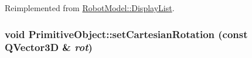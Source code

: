 Reimplemented from \hyperlink{class_robot_model_1_1_display_list_a56a652740c494995c0ff55d1a5fd896d}{RobotModel::DisplayList}.\hypertarget{class_robot_model_1_1_primitive_object_a0a7cfefb126e4f37c208c516f8ffd9bb}{
\subsubsection[{setCartesianRotation}]{\setlength{\rightskip}{0pt plus 5cm}void PrimitiveObject::setCartesianRotation (const QVector3D \& {\em rot})}}
\label{class_robot_model_1_1_primitive_object_a0a7cfefb126e4f37c208c516f8ffd9bb}


